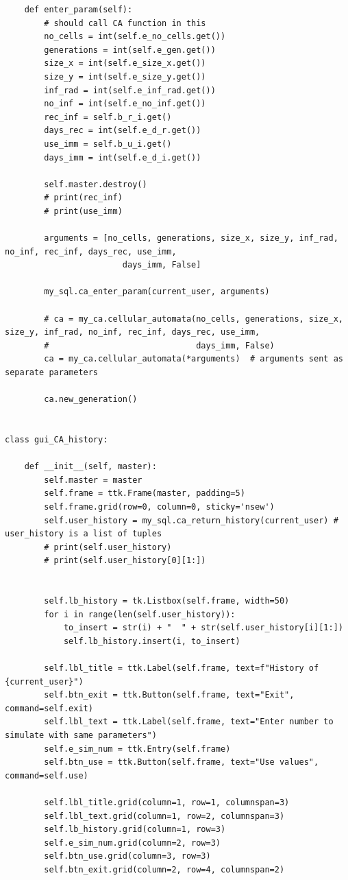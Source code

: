 \documentclass[11pt, a4paper]{article}
\begin{document}
\begin{lstlisting}
    def enter_param(self):
        # should call CA function in this
        no_cells = int(self.e_no_cells.get())
        generations = int(self.e_gen.get())
        size_x = int(self.e_size_x.get())
        size_y = int(self.e_size_y.get())
        inf_rad = int(self.e_inf_rad.get())
        no_inf = int(self.e_no_inf.get())
        rec_inf = self.b_r_i.get()
        days_rec = int(self.e_d_r.get())
        use_imm = self.b_u_i.get()
        days_imm = int(self.e_d_i.get())

        self.master.destroy()
        # print(rec_inf)
        # print(use_imm)

        arguments = [no_cells, generations, size_x, size_y, inf_rad, no_inf, rec_inf, days_rec, use_imm,
                        days_imm, False]

        my_sql.ca_enter_param(current_user, arguments)

        # ca = my_ca.cellular_automata(no_cells, generations, size_x, size_y, inf_rad, no_inf, rec_inf, days_rec, use_imm,
        #                              days_imm, False)
        ca = my_ca.cellular_automata(*arguments)  # arguments sent as separate parameters

        ca.new_generation()


class gui_CA_history:

    def __init__(self, master):
        self.master = master
        self.frame = ttk.Frame(master, padding=5)
        self.frame.grid(row=0, column=0, sticky='nsew')
        self.user_history = my_sql.ca_return_history(current_user) # user_history is a list of tuples
        # print(self.user_history)
        # print(self.user_history[0][1:])


        self.lb_history = tk.Listbox(self.frame, width=50)
        for i in range(len(self.user_history)):
            to_insert = str(i) + "  " + str(self.user_history[i][1:])
            self.lb_history.insert(i, to_insert)

        self.lbl_title = ttk.Label(self.frame, text=f"History of {current_user}")
        self.btn_exit = ttk.Button(self.frame, text="Exit", command=self.exit)
        self.lbl_text = ttk.Label(self.frame, text="Enter number to simulate with same parameters")
        self.e_sim_num = ttk.Entry(self.frame)
        self.btn_use = ttk.Button(self.frame, text="Use values", command=self.use)

        self.lbl_title.grid(column=1, row=1, columnspan=3)
        self.lbl_text.grid(column=1, row=2, columnspan=3)
        self.lb_history.grid(column=1, row=3)
        self.e_sim_num.grid(column=2, row=3)
        self.btn_use.grid(column=3, row=3)
        self.btn_exit.grid(column=2, row=4, columnspan=2)


\end{lstlisting}
\end{document}
